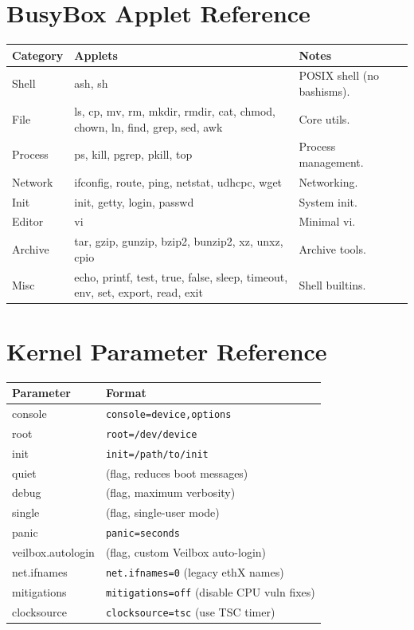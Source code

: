 \section{BusyBox Applet Reference}

\begin{longtable}{|p{3cm}|p{4cm}|p{5cm}|}
\hline
\textbf{Category} & \textbf{Applets} & \textbf{Notes} \\
\hline
Shell & ash, sh & POSIX shell (no bashisms). \\
File & ls, cp, mv, rm, mkdir, rmdir, cat, chmod, chown, ln, find, grep, sed, awk & Core utils. \\
Process & ps, kill, pgrep, pkill, top & Process management. \\
Network & ifconfig, route, ping, netstat, udhcpc, wget & Networking. \\
Init & init, getty, login, passwd & System init. \\
Editor & vi & Minimal vi. \\
Archive & tar, gzip, gunzip, bzip2, bunzip2, xz, unxz, cpio & Archive tools. \\
Misc & echo, printf, test, true, false, sleep, timeout, env, set, export, read, exit & Shell builtins. \\
\hline
\end{longtable}

\section{Kernel Parameter Reference}

\begin{longtable}{|p{6cm}|p{7cm}|}
\hline
\textbf{Parameter} & \textbf{Format} \\
\hline
console & \texttt{console=device,options} \\
root & \texttt{root=/dev/device} \\
init & \texttt{init=/path/to/init} \\
quiet & (flag, reduces boot messages) \\
debug & (flag, maximum verbosity) \\
single & (flag, single-user mode) \\
panic & \texttt{panic=seconds} \\
veilbox.autologin & (flag, custom Veilbox auto-login) \\
net.ifnames & \texttt{net.ifnames=0} (legacy ethX names) \\
mitigations & \texttt{mitigations=off} (disable CPU vuln fixes) \\
clocksource & \texttt{clocksource=tsc} (use TSC timer) \\
\hline
\end{longtable}


